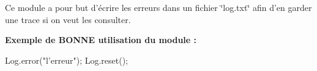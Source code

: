 Ce module a pour but d'écrire les erreurs dans un fichier \char`\"{}log.\-txt\char`\"{} afin d'en garder une trace si on veut les consulter.

{\bfseries Exemple de B\-O\-N\-N\-E utilisation du module \-: } \begin{DoxyVerb}  Log.error("l'erreur");
  Log.reset();\end{DoxyVerb}
 